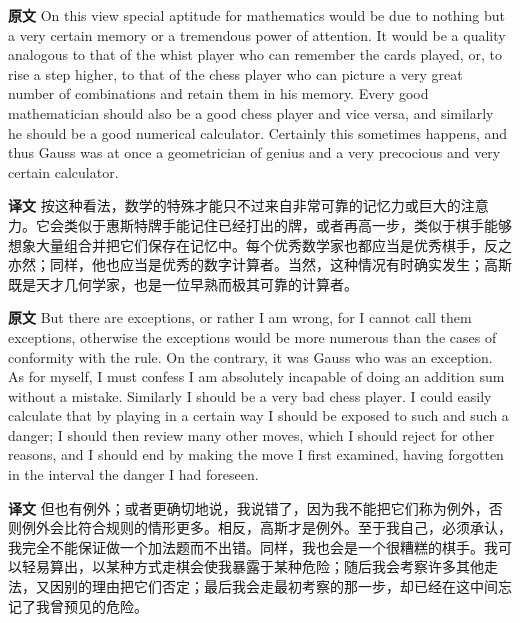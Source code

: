 \documentclass[UTF8,zihao=-4]{ctexart}
\newcommand{\BodyFont}{\fontsize{10.5pt}{15.5pt}\selectfont}
\newcommand{\origlabel}{\textbf{原文}\quad}
\newcommand{\translabel}{\textbf{译文}\quad}
\newenvironment{enblock}{\par\noindent\begingroup\BodyFont\origlabel}{\par\endgroup}
\newenvironment{zhblock}{\par\noindent\begingroup\BodyFont\translabel}{\par\endgroup\vspace{0.35em}}
\begin{document}
\begin{enblock}
On this view special aptitude for mathematics would be due to nothing but a very certain memory or a tremendous power of attention. It would be a quality analogous to that of the whist player who can remember the cards played, or, to rise a step higher, to that of the chess player who can picture a very great number of combinations and retain them in his memory. Every good mathematician should also be a good chess player and vice versa, and similarly he should be a good numerical calculator. Certainly this sometimes happens, and thus Gauss was at once a geometrician of genius and a very precocious and very certain calculator.
\end{enblock}
\begin{zhblock}
按这种看法，数学的特殊才能只不过来自非常可靠的记忆力或巨大的注意力。它会类似于惠斯特牌手能记住已经打出的牌，或者再高一步，类似于棋手能够想象大量组合并把它们保存在记忆中。每个优秀数学家也都应当是优秀棋手，反之亦然；同样，他也应当是优秀的数字计算者。当然，这种情况有时确实发生；高斯既是天才几何学家，也是一位早熟而极其可靠的计算者。\end{zhblock}

\begin{enblock}
But there are exceptions, or rather I am wrong, for I cannot call them exceptions, otherwise the exceptions would be more numerous than the cases of conformity with the rule. On the contrary, it was Gauss who was an exception. As for myself, I must confess I am absolutely incapable of doing an addition sum without a mistake. Similarly I should be a very bad chess player. I could easily calculate that by playing in a certain way I should be exposed to such and such a danger; I should then review many other moves, which I should reject for other reasons, and I should end by making the move I first examined, having forgotten in the interval the danger I had foreseen.
\end{enblock}
\begin{zhblock}
但也有例外；或者更确切地说，我说错了，因为我不能把它们称为例外，否则例外会比符合规则的情形更多。相反，高斯才是例外。至于我自己，必须承认，我完全不能保证做一个加法题而不出错。同样，我也会是一个很糟糕的棋手。我可以轻易算出，以某种方式走棋会使我暴露于某种危险；随后我会考察许多其他走法，又因别的理由把它们否定；最后我会走最初考察的那一步，却已经在这中间忘记了我曾预见的危险。\end{zhblock}
\end{document}
